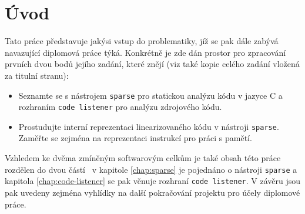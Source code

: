 \chapter*{Úvod}
\label{chap:uvod}

Tato práce představuje jakýsi vstup do problematiky, jíž se pak dále
zabývá navazující diplomová práce týká. Konkrétně je zde dán prostor
pro zpracování prvních dvou bodů jejího zadání, které znějí (viz také kopie
celého zadání vložená za titulní stranu):

\begin{itemize}
    \item Seznamte se s nástrojem \texttt{sparse} pro statickou analýzu kódu v jazyce C
          a rozhraním \texttt{code listener} pro analýzu zdrojového kódu.
    \item Prostudujte interní reprezentaci linearizovaného kódu v nástroji \texttt{sparse}.
          Zaměřte se zejména na reprezentaci instrukcí pro práci s pamětí.
\end{itemize}

Vzhledem ke dvěma zmíněným softwarovým celkům je také obsah této práce rozdělen do
dvou částí \ndash\ v kapitole \ref{chap:sparse} je pojednáno o nástroji \texttt{sparse}
a kapitola \ref{chap:code-listener} se pak věnuje rozhraní \texttt{code listener}.
V závěru jsou pak uvedeny zejména vyhlídky na další pokračování projektu
pro účely diplomové práce.
